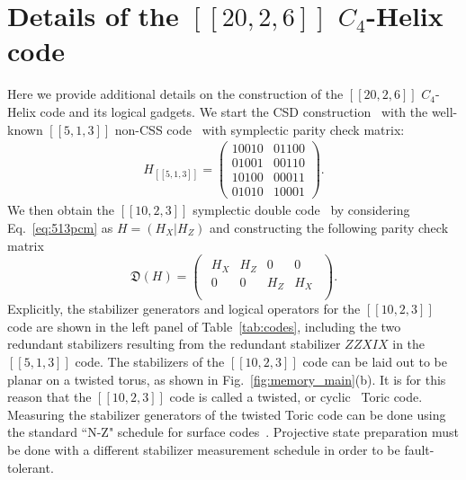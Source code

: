 \section{Details of the $[[20,2,6]]$ $C_4$-Helix code}
\label{apx:code_construction}


Here we provide additional details on the construction of the $[[20,2,6]]$ $C_4$-Helix code and its logical gadgets. We start the CSD construction~\cite{berthusen2025simple} with the well-known $[[5,1,3]]$ non-CSS code~\cite{laflamme1996} with symplectic parity check matrix:
\begin{align}
H_{[[5,1,3]]} =  \left(\begin{array}{c|c}
1 0 0 1 0 & 0 1 1 0 0 \\
0 1 0 0 1 & 0 0 1 1 0 \\
1 0 1 0 0 & 0 0 0 1 1 \\
0 1 0 1 0 & 1 0 0 0 1 
\end{array} \right).
\label{eq:513pcm}
\end{align}
We then obtain the $[[10,2,3]]$ symplectic double code~\cite{burton2024} by considering Eq.~\eqref{eq:513pcm} as $H = (H_X|H_Z)$ and constructing the following parity check matrix
\begin{equation}
\mathfrak{D}(H) = \begin{pmatrix}
\begin{array}{cc|cc}
H_X & H_Z & 0 & 0 \\
0 & 0 & H_Z & H_X \\
\end{array}
\end{pmatrix}.
\label{eq:pcm_double}
\end{equation}
Explicitly, the stabilizer generators and logical operators for the $[[10,2,3]]$ code are shown in the left panel of Table~\ref{tab:codes}, including the two redundant stabilizers resulting from the redundant stabilizer $ZZXIX$ in the $[[5,1,3]]$ code. The stabilizers of the $[[10,2,3]]$ code can be laid out to be planar on a twisted torus, as shown in Fig.~\ref{fig:memory_main}(b). It is for this reason that the $[[10,2,3]]$ code is called a twisted, or cyclic~\cite{Sarkar_2024} Toric code. Measuring the stabilizer generators of the twisted Toric code can be done using the standard ``N-Z" schedule for surface codes~\cite{Tomita_2014}. Projective state preparation must be done with a different stabilizer measurement schedule in order to be fault-tolerant.



